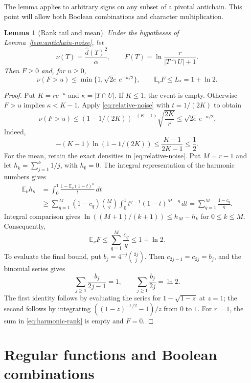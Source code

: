 \documentclass[11pt]{amsart}
\newtheorem{lemma}[theorem]{Lemma}
\theoremstyle{definition}
\theoremstyle{remark}
\newcommand{\E}{\mathbb E}
\newcommand{\wh}[1]{\widehat{#1}}
\newcommand{\Lp}{L_*}
\begin{document}
The lemma applies to arbitrary signs on any subset of a pivotal antichain. This point will allow both Boolean combinations and character multiplication.

\begin{lemma}[Rank tail and mean]\label{lem:ranktail}
Under the hypotheses of Lemma~\ref{lem:antichain-noise}, let
\[
 \nu(T)=\frac{\wh d(T)^2}{\alpha},
 \qquad
 F(T)=\ln\frac r{|T\cap U|+1}.
\]
Then $F\ge0$ and, for $u\ge0$,
\begin{equation}\label{eq:ranktail}
 \nu(F>u)\le\min\{1,\sqrt{2e}\,e^{-u/2}\},
 \qquad
 \E_\nu F\le\Lp=1+\ln2.
\end{equation}
\end{lemma}
\begin{proof}
Put $K=re^{-u}$ and $\kappa=|T\cap U|$.
If $K\le1$, the event is empty.
Otherwise $F>u$ implies $\kappa<K-1$.
Apply \eqref{eq:relative-noise} with $t=1/(2K)$ to obtain
\[
 \nu(F>u)
 \le(1-1/(2K))^{-(K-1)}\sqrt{\frac{2K}{r}}
 \le\sqrt{2e}\,e^{-u/2}.
\]
Indeed,
\[
 -(K-1)\ln(1-1/(2K))
 \le\frac{K-1}{2K-1}\le\frac12.
\]
For the mean, retain the exact densities in \eqref{eq:relative-noise}.
Put $M=r-1$ and let $h_k=\sum_{j=1}^k1/j$, with $h_0=0$.
The integral representation of the harmonic numbers gives
\begin{align*}
 \E_\nu h_\kappa
 &=\int_0^1\frac{1-\E_\nu(1-t)^\kappa}{t}\,dt\\
 &\ge\sum_{q=1}^M(1-c_q)\binom Mq
                  \int_0^1t^{q-1}(1-t)^{M-q}\,dt
 =\sum_{q=1}^M\frac{1-c_q}{q}.
\end{align*}
Integral comparison gives
$\ln((M+1)/(k+1))\le h_M-h_k$ for $0\le k\le M$.
Consequently,
\begin{equation}\label{eq:harmonic-rank}
 \E_\nu F\le\sum_{q=1}^M\frac{c_q}{q}\le1+\ln2.
\end{equation}
To evaluate the final bound, put $b_j=4^{-j}\binom{2j}j$.
Then $c_{2j-1}=c_{2j}=b_j$, and the binomial series gives
\[
 \sum_{j\ge1}\frac{b_j}{2j-1}=1,
 \qquad \sum_{j\ge1}\frac{b_j}{2j}=\ln2.
\]
The first identity follows by evaluating the series for $1-\sqrt{1-z}$
at $z=1$; the second follows by integrating
$((1-z)^{-1/2}-1)/z$ from $0$ to $1$.
For $r=1$, the sum in \eqref{eq:harmonic-rank} is empty and $F=0$.
\end{proof}

\section{Regular functions and Boolean combinations}\label{sec:regular}
\end{document}
